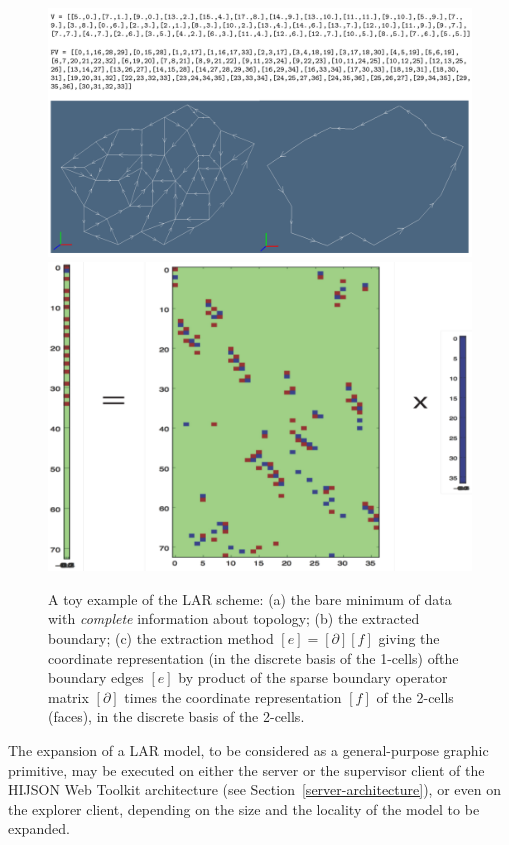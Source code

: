 \documentclass{sig-alternate}
\begin{document}
\begin{figure}[htbp] %
   \centering
   \includegraphics[width=0.5\linewidth]{images/minimum} 
   \hfill
   \includegraphics[width=0.4\linewidth]{images/boundary} 
   \caption{A toy example of the LAR scheme: (a) the bare minimum of data with \emph{complete} information about topology; (b) the extracted boundary; (c) the extraction method $[e] = [\partial][f]$ giving the coordinate representation (in the discrete basis of the 1-cells) ofthe boundary edges $[e]$ by product of the sparse boundary operator matrix $[\partial]$ times the coordinate representation $[f]$ of the 2-cells (faces), in the discrete basis of the 2-cells.}
   \label{fig:minimum}
\end{figure}


The expansion of a LAR model, to be considered as a general-purpose graphic primitive, may be executed on either  the server or the supervisor client of the HIJSON Web Toolkit architecture (see Section~\ref{server-architecture}), or even on the explorer client, depending on the size and the locality of the model to be expanded.

\end{document}
